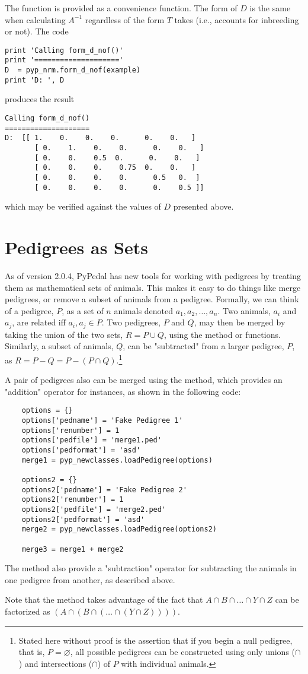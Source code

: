 The function  is provided as a convenience function. The form of $D$ is the same when calculating $A^{-1}$ regardless of the form $T$ takes (i.e., accounts for inbreeding or not). The code
\begin{verbatim}
print 'Calling form_d_nof()'
print '===================='
D  = pyp_nrm.form_d_nof(example)
print 'D: ', D
\end{verbatim}
produces the result
\begin{verbatim}
Calling form_d_nof()
====================
D:  [[ 1.    0.    0.    0.      0.    0.   ]
       [ 0.    1.    0.    0.      0.    0.   ]
       [ 0.    0.    0.5  0.      0.    0.   ]
       [ 0.    0.    0.    0.75  0.    0.   ]
       [ 0.    0.    0.    0.      0.5   0.  ]
       [ 0.    0.    0.    0.      0.    0.5 ]]
\end{verbatim}
which may be verified against the values of $D$ presented above.

\section{Pedigrees as Sets}\label{sec:pedigrees-as-sets}
As of version 2.0.4, PyPedal has new tools for working with pedigrees by treating them as mathematical sets
of animals. This makes it easy to do things like merge pedigrees, or remove a subset of animals from a pedigree.
Formally, we can think of a pedigree, $P$, as a set of $n$ animals denoted $a_1, a_2, \ldots, a_n$. Two animals,
$a_i$ and $a_j$, are related iff $a_i, a_j \in P$. Two pedigrees, $P$ and $Q$, may then be merged by taking the
union of the two sets, $R = P \cup Q$, using the  method or
 functions. Similarly, a subset of animals, $Q$, can be "subtracted" from a larger
pedigree, $P$, as $R = P - Q = P - (P \cap Q)$.\footnote{Stated here without proof is the assertion that if you begin
a null pedigree, that is, $P = \varnothing$, all possible pedigrees can be constructed using only unions ($\cap$)
and intersections ($\cap$) of $P$ with individual animals.}

A pair of pedigrees also can be merged using the  method, which provides an
"addition" operator for  instances, as shown in the following code:
\begin{verbatim}
    options = {}
    options['pedname'] = 'Fake Pedigree 1'
    options['renumber'] = 1
    options['pedfile'] = 'merge1.ped'
    options['pedformat'] = 'asd'
    merge1 = pyp_newclasses.loadPedigree(options)

    options2 = {}
    options2['pedname'] = 'Fake Pedigree 2'
    options2['renumber'] = 1
    options2['pedfile'] = 'merge2.ped'
    options2['pedformat'] = 'asd'
    merge2 = pyp_newclasses.loadPedigree(options2)

    merge3 = merge1 + merge2
\end{verbatim}
The  method also provide a "subtraction" operator for subtracting the animals in
one pedigree from another, as described above.

Note that the  method takes advantage of the fact that $A \cap B \cap \ldots \cap Y \cap Z$
can be factorized as $(A \cap (B \cap (\ldots \cap (Y \cap Z))))$.
